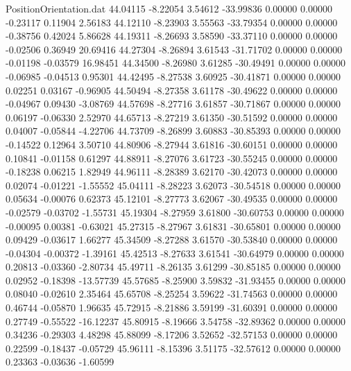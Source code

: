 \begin{filecontents}{PositionOrientation.dat}
  44.04115   -8.22054    3.54612   -33.99836    0.00000    0.00000   -0.23117    0.11904    2.56183
  44.12110   -8.23903    3.55563   -33.79354    0.00000    0.00000   -0.38756    0.42024    5.86628
  44.19311   -8.26693    3.58590   -33.37110    0.00000    0.00000   -0.02506    0.36949   20.69416
  44.27304   -8.26894    3.61543   -31.71702    0.00000    0.00000   -0.01198   -0.03579   16.98451
  44.34500   -8.26980    3.61285   -30.49491    0.00000    0.00000   -0.06985   -0.04513    0.95301
  44.42495   -8.27538    3.60925   -30.41871    0.00000    0.00000    0.02251    0.03167   -0.96905
  44.50494   -8.27358    3.61178   -30.49622    0.00000    0.00000   -0.04967    0.09430   -3.08769
  44.57698   -8.27716    3.61857   -30.71867    0.00000    0.00000    0.06197   -0.06330    2.52970
  44.65713   -8.27219    3.61350   -30.51592    0.00000    0.00000    0.04007   -0.05844   -4.22706
  44.73709   -8.26899    3.60883   -30.85393    0.00000    0.00000   -0.14522    0.12964    3.50710
  44.80906   -8.27944    3.61816   -30.60151    0.00000    0.00000    0.10841   -0.01158    0.61297
  44.88911   -8.27076    3.61723   -30.55245    0.00000    0.00000   -0.18238    0.06215    1.82949
  44.96111   -8.28389    3.62170   -30.42073    0.00000    0.00000    0.02074   -0.01221   -1.55552
  45.04111   -8.28223    3.62073   -30.54518    0.00000    0.00000    0.05634   -0.00076    0.62373
  45.12101   -8.27773    3.62067   -30.49535    0.00000    0.00000   -0.02579   -0.03702   -1.55731
  45.19304   -8.27959    3.61800   -30.60753    0.00000    0.00000   -0.00095    0.00381   -0.63021
  45.27315   -8.27967    3.61831   -30.65801    0.00000    0.00000    0.09429   -0.03617    1.66277
  45.34509   -8.27288    3.61570   -30.53840    0.00000    0.00000   -0.04304   -0.00372   -1.39161
  45.42513   -8.27633    3.61541   -30.64979    0.00000    0.00000    0.20813   -0.03360   -2.80734
  45.49711   -8.26135    3.61299   -30.85185    0.00000    0.00000    0.02952   -0.18398  -13.57739
  45.57685   -8.25900    3.59832   -31.93455    0.00000    0.00000    0.08040   -0.02610    2.35464
  45.65708   -8.25254    3.59622   -31.74563    0.00000    0.00000    0.46744   -0.05870    1.96635
  45.72915   -8.21886    3.59199   -31.60391    0.00000    0.00000    0.27749   -0.55522  -16.12237
  45.80915   -8.19666    3.54758   -32.89362    0.00000    0.00000    0.34236   -0.29303    4.48298
  45.88099   -8.17206    3.52652   -32.57153    0.00000    0.00000    0.22599   -0.18437   -0.05729
  45.96111   -8.15396    3.51175   -32.57612    0.00000    0.00000    0.23363   -0.03636   -1.60599

\end{filecontents}

